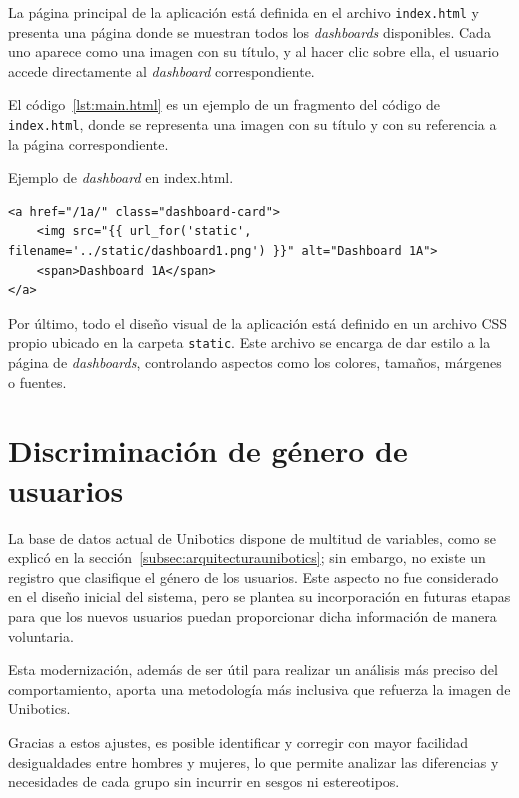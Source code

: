 \documentclass[a4paper, 12pt]{book}
\begin{document}
La página principal de la aplicación está definida en el archivo \texttt{index.html} y presenta una página donde se muestran todos los \textit{dashboards} disponibles. Cada uno aparece como una imagen con su título, y al hacer clic sobre ella, el usuario accede directamente al \textit{dashboard} correspondiente.

El código~\ref{lst:main.html} es un ejemplo de un fragmento del código de \texttt{index.html}, donde se representa una imagen con su título y con su referencia a la página correspondiente.

\begin{listing}[h!]
\caption{Ejemplo de \textit{dashboard} en index.html.}
\label{lst:main.html}
\begin{verbatim}
<a href="/1a/" class="dashboard-card">
    <img src="{{ url_for('static', filename='../static/dashboard1.png') }}" alt="Dashboard 1A">
    <span>Dashboard 1A</span>
</a>
\end{verbatim}
\end{listing}

Por último, todo el diseño visual de la aplicación está definido en un archivo CSS propio ubicado en la carpeta \texttt{static}. Este archivo se encarga de dar estilo a la página de \textit{dashboards}, controlando aspectos como los colores, tamaños, márgenes o fuentes.

\section{Discriminación de género de usuarios}

La base de datos actual de Unibotics dispone de multitud de variables, como se explicó en la sección~\ref{subsec:arquitecturaunibotics}; sin embargo, no existe un registro que clasifique el género de los usuarios. Este aspecto no fue considerado en el diseño inicial del sistema, pero se plantea su incorporación en futuras etapas para que los nuevos usuarios puedan proporcionar dicha información de manera voluntaria.

Esta modernización, además de ser útil para realizar un análisis más preciso del comportamiento, aporta una metodología más inclusiva que refuerza la imagen de Unibotics.

Gracias a estos ajustes, es posible identificar y corregir con mayor facilidad desigualdades entre hombres y mujeres, lo que permite analizar las diferencias y necesidades de cada grupo sin incurrir en sesgos ni estereotipos.
\end{document}
